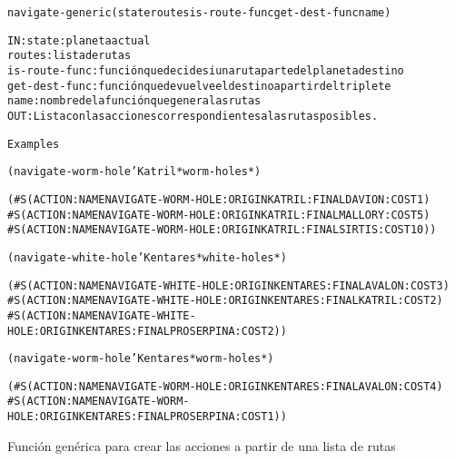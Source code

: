 \begin{aibox}{\function}
\begin{alltt}
navigate-generic (state routes is-route-func get-dest-func name)


IN:    state: planeta actual
       routes: lista de rutas
        is-route-func: función que decide si una ruta parte del planeta destino
       get-dest-func: función que devuelve el destino a partir del triplete
       name: nombre de la función que genera las rutas
OUT:    Lista con las acciones correspondientes a las rutas posibles.

\end{alltt}
\end{aibox}

\begin{aibox}{\examples}
\begin{alltt}
Examples

(navigate-worm-hole 'Katril *worm-holes*)

(\#S(ACTION :NAME NAVIGATE-WORM-HOLE :ORIGIN KATRIL :FINAL DAVION :COST 1)
 \#S(ACTION :NAME NAVIGATE-WORM-HOLE :ORIGIN KATRIL :FINAL MALLORY :COST 5)
 \#S(ACTION :NAME NAVIGATE-WORM-HOLE :ORIGIN KATRIL :FINAL SIRTIS :COST 10))

(navigate-white-hole 'Kentares *white-holes*)

(\#S(ACTION :NAME NAVIGATE-WHITE-HOLE :ORIGIN KENTARES :FINAL AVALON :COST 3)
 \#S(ACTION :NAME NAVIGATE-WHITE-HOLE :ORIGIN KENTARES :FINAL KATRIL :COST 2)
 \#S(ACTION :NAME NAVIGATE-WHITE-HOLE :ORIGIN KENTARES :FINAL PROSERPINA :COST 2))

(navigate-worm-hole 'Kentares *worm-holes*)

(\#S(ACTION :NAME NAVIGATE-WORM-HOLE :ORIGIN KENTARES :FINAL AVALON :COST 4)
 \#S(ACTION :NAME NAVIGATE-WORM-HOLE :ORIGIN KENTARES :FINAL PROSERPINA :COST 1))


\end{alltt}
\end{aibox}

\begin{aibox}{\comments}
Función genérica para crear las acciones a partir de una lista de rutas

\end{aibox}

